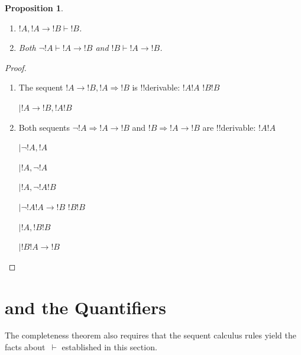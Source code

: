\documentclass[10pt,a4paper]{article}
\theoremstyle{plain}
\newtheorem{prop}[thm]{Proposition}
\theoremstyle{definition}
\theoremstyle{remark}
\newenvironment{explain}{}{}
\newcommand*{\olfileid}[3]{}
\newcommand*{\olsection}[1]{\section*{#1}}
\newcommand*{\ollabel}[1]{\label{#1}}
\providecommand{\RightLabel}[1]{}
\providecommand{\DisplayProof}{}
\providecommand{\fCenter}{}
\newenvironment{prooftree}{}{}
\providecommand{\lif}{\mathbin{\rightarrow}}
\providecommand{\Sequent}{\mathrel{\Rightarrow}}
\providecommand{\Proves}{\mathrel{\vdash}}
\providecommand{\LeftR}[1]{}
\providecommand{\RightR}[1]{}
\providecommand{\UnaryInf}{\ensuremath{\mid}}
\providecommand{\BinaryInf}{\ensuremath{\mid}}
\providecommand{\Weakening}{\mathrm{Wk}}
\providecommand{\RightR}{\mathrm{R}}
\providecommand{\LeftR}{\mathrm{L}}
\providecommand{\Axiom}{\mathrm{Ax}}
\begin{document}
\begin{prop}\ollabel{prop:provability-lif}
  \begin{enumerate}
  \item \ollabel{prop:provability-lif-left}  $!A, !A \lif !B \Proves !B$.
  \item \ollabel{prop:provability-lif-right}
    Both $\lnot !A \Proves !A \lif !B$ and $!B \Proves !A \lif !B$.
  \end{enumerate}
\end{prop}

\begin{proof}
  \begin{enumerate}
    \item The sequent $!A \lif !B, !A \Sequent !B$ is !!{derivable}:
      \begin{prooftree}
        \Axiom$!A \fCenter !A$
        \Axiom$!B \fCenter !B$
        \RightLabel{\LeftR{\lif}}
        \BinaryInf$!A \lif !B, !A  \fCenter !B$
      \end{prooftree}
    \item Both sequents $\lnot !A \Sequent !A \lif !B$ and $!B
      \Sequent !A \lif !B$ are !!{derivable}:
      \begin{prooftree}
        \Axiom$!A \fCenter !A$
        \RightLabel{\LeftR{\lnot}}
        \UnaryInf$\lnot !A, !A \fCenter$
        \RightLabel{\LeftR{\Exchange}}
        \UnaryInf$!A, \lnot !A \fCenter$
        \RightLabel{\RightR{\Weakening}}
        \UnaryInf$!A, \lnot !A \fCenter !B$
        \RightLabel{\RightR{\lif}}
        \UnaryInf$\lnot !A \fCenter !A \lif !B$
        \DisplayProof\qquad\bottomAlignProof
        \Axiom$!B \fCenter !B$
        \RightLabel{\LeftR{\Weakening}}
        \UnaryInf$!A, !B \fCenter !B$
        \RightLabel{\RightR{\lif}}
        \UnaryInf$!B \fCenter !A \lif !B$
      \end{prooftree}
  \end{enumerate}
\end{proof}





\olfileid{fol}{seq}{qpr}
\olsection{ and the Quantifiers}

\begin{explain}
  The completeness theorem also requires that the sequent calculus
  rules yield the facts about~$\Proves$ established in this
  section.
\end{explain}
\end{document}
